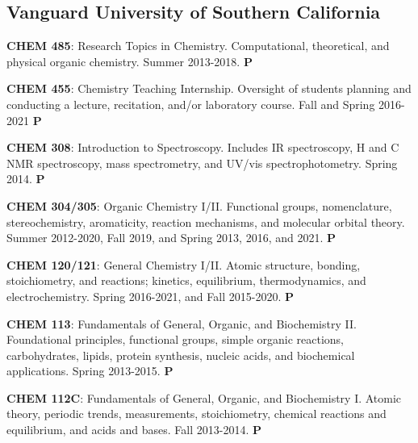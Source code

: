 \documentclass[10pt]{article}
\newcommand*\teitem[4]{\textbf{#1}: #2 #3 \textbf{#4}}
\begin{document}

\subsection*{Vanguard University of Southern California}


\teitem{CHEM 485}{Research Topics in Chemistry. Computational, theoretical, and physical organic chemistry.}{Summer 2013-2018.}{P}

\teitem{CHEM 455}{Chemistry Teaching Internship. Oversight of students planning and conducting a lecture, recitation, and/or laboratory course.}{Fall and Spring 2016-2021}{P}

\teitem{CHEM 308}{Introduction to Spectroscopy. Includes IR spectroscopy, \raisebox{1mm}{\scriptsize 1}H and \raisebox{1mm}{\scriptsize 13}C NMR spectroscopy, mass spectrometry, and UV/vis spectrophotometry.}{Spring 2014.}{P}

\teitem{CHEM 304/305}{Organic Chemistry I/II. Functional groups, nomenclature, stereochemistry, aromaticity, reaction mechanisms, and molecular orbital theory.}{Summer 2012-2020, Fall 2019, and Spring 2013, 2016, and 2021.}{P} 

\teitem{CHEM 120/121}{General Chemistry I/II. Atomic structure, bonding, stoichiometry, and reactions; kinetics, equilibrium, thermodynamics, and electrochemistry.}{Spring 2016-2021, and Fall 2015-2020.}{P}

\teitem{CHEM 113}{Fundamentals of General, Organic, and Biochemistry II. Foundational principles, functional groups, simple organic reactions, carbohydrates, lipids, protein synthesis, nucleic acids, and biochemical applications.}{Spring 2013-2015.}{P} 

\teitem{CHEM 112C}{Fundamentals of General, Organic, and Biochemistry I. Atomic theory, periodic trends, measurements, stoichiometry, chemical reactions and equilibrium, and acids and bases.}{Fall 2013-2014.}{P}
\end{document}
